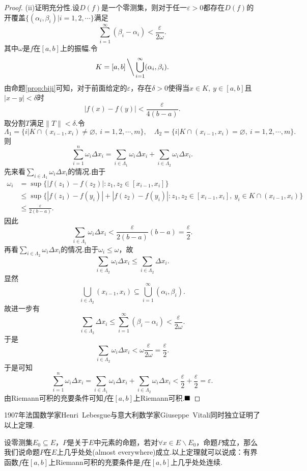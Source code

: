 \begin{proof}
	(ii)证明充分性.设$D(f)$是一个零测集，则对于任一$\varepsilon>0$都存在$D(f)$的开覆盖$\{(\alpha_i,\beta_i)|i=1,2,\cdots\}$满足
	$$\sum_{i=1}^{\infty}(\beta_i-\alpha_i)<\frac{\varepsilon}{2\omega}.$$
	其中$\omega$是$f$在$\left[a,b\right]$上的振幅.令
	$$K=\left[a,b\right]\bigg\backslash\bigcup_{i=1}^{\infty}(\alpha_i,\beta_i).$$
	由命题\ref{prop:biji}可知，对于前面给定的$\varepsilon$，存在$\delta>0$使得当$x\in K,\ y\in\left[a,b\right]$且$|x-y|<\delta$时
	$$|f(x)-f(y)|<\frac{\varepsilon}{4(b-a)}.$$
	取分割$T$满足$\|T\|<\delta$.令
	$$\Lambda_1=\{i|K\cap(x_{i-1},x_i)\neq\varnothing,\ i=1,2,\cdots,m\},\quad \Lambda_2=\{i|K\cap(x_{i-1},x_i)=\varnothing,\ i=1,2,\cdots,m\}.$$
	则
	$$\sum_{i=1}^{n}\omega_i\Delta x_i=\sum_{i\in\Lambda_1}\omega_i\Delta x_i+\sum_{i\in\Lambda_2}\omega_i\Delta x_i.$$
	先来看$\displaystyle\sum_{i\in\Lambda_1}\omega_i\Delta x_i$的情况.由于
	\begin{align*}
		\omega_i
		&=\sup\{|f(z_1)-f(z_2)|:z_1,z_2\in\left[x_{i-1},x_i\right]\}\\
		&\leqslant\sup\{|f(z_1)-f(y_i)|+|f(z_2)-f(y_i)|:z_1,z_2\in\left[x_{i-1},x_i\right],\ y_i\in K\cap(x_{i-1},x_i)\}\\
		&\leqslant\frac{\varepsilon}{2(b-a)}.
	\end{align*}
	因此
	$$\sum_{i\in\Lambda_1}\omega_i\Delta x_i<\frac{\varepsilon}{2(b-a)}(b-a)=\frac{\varepsilon}{2}.$$
	再看$\displaystyle\sum_{i\in\Lambda_2}\omega_i\Delta x_i$的情况.由于$\omega_i\leqslant\omega$，故
	$$\sum_{i\in\Lambda_2}\omega_i\Delta x_i\leqslant\sum_{i\in\Lambda_2}\Delta x_i.$$
	显然
	$$\bigcup_{i\in\Lambda_2}(x_{i-1},x_i)\subseteq\bigcup_{i=1}^{\infty}(\alpha_i,\beta_i).$$
	故进一步有
	$$\sum_{i\in\Lambda_2}\Delta x_i\leqslant\sum_{i=1}^{\infty}(\beta_i-\alpha_i)<\frac{\varepsilon}{2\omega}.$$
	于是
	$$\sum_{i\in\Lambda_2}\omega_i\Delta x_i<\omega\frac{\varepsilon}{2\omega}=\frac{\varepsilon}{2}.$$
	于是可知
	$$\sum_{i=1}^{n}\omega_i\Delta x_i=\sum_{i\in\Lambda_1}\omega_i\Delta x_i+\sum_{i\in\Lambda_2}\omega_i\Delta x_i<\frac{\varepsilon}{2}+\frac{\varepsilon}{2}=\varepsilon.$$
	由Riemann可积的充要条件可知$f$在$\left[a,b\right]$上Riemann可积.$\hfill\blacksquare$
\end{proof}
\begin{remark}
	1907年法国数学家Henri\ Lebesgue与意大利数学家Giuseppe\ Vitali同时独立证明了以上定理.
\end{remark}
\begin{remark}
	设零测集$E_0\subseteq E$，$P$是关于$E$中元素的命题，若对$\forall x\in E\backslash E_0$，命题$P$成立，那么我们说命题$P$在$E$上{\heiti 几乎处处}(almost everywhere)成立.以上定理就可以说成：有界函数$f$在$\left[a,b\right]$上Riemann可积的充要条件是$f$在$\left[a,b\right]$上几乎处处连续.
\end{remark}

